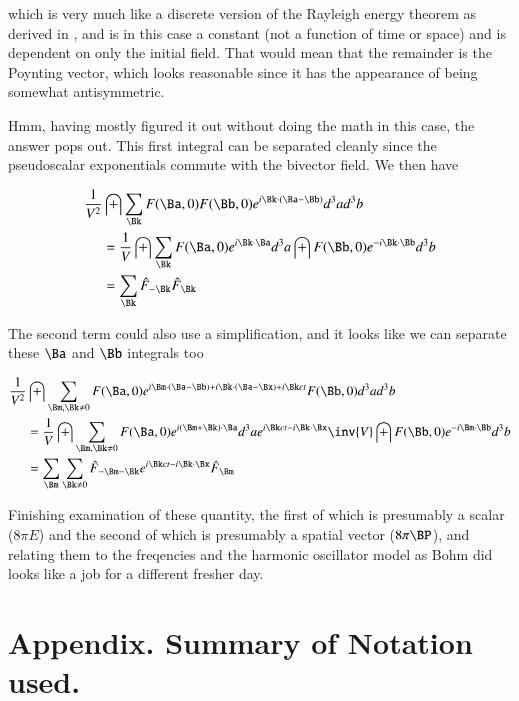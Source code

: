 \documentclass{article}
\begin{document}
which is very much like a discrete version of the Rayleigh energy theorem as derived in \cite{PJqmFourier}, and is in this case
a constant (not a function of time or space) and is dependent on only the initial field.
That would mean that the remainder is the Poynting vector,
which looks reasonable since it has the appearance of being somewhat antisymmetric.

Hmm, having mostly figured it out without doing the math in this case, the answer pops out.  This first integral can be separated cleanly since the pseudoscalar
exponentials commute with the bivector field.  We then have

\begin{align*}
\frac{1}{V^2} &\int \sum_{\Bk} F(\Ba, 0) F(\Bb, 0) e^{ i \Bk \cdot (\Ba - \Bb) } d^3 a d^3 b \\
&= \frac{1}{V} \int \sum_{\Bk} F(\Ba, 0) e^{ i \Bk \cdot \Ba } d^3 a \int F(\Bb, 0) e^{ -i \Bk \cdot \Bb } d^3 b \\
&= \sum_{\Bk} \hat{F}_{-\Bk} \hat{F}_{\Bk} \\
\end{align*}


The second term could also use a simplification, and it looks like we can separate these $\Ba$ and $\Bb$ integrals too

\begin{align*}
\frac{1}{V^2} &\int \sum_{\Bm, \Bk \ne 0} F(\Ba, 0) e^{ 
i \Bm \cdot (\Ba -\Bb) 
+i \Bk \cdot (\Ba -\Bx)
+ i \Bk ct 
} F(\Bb, 0) d^3 a d^3 b \\
&=\frac{1}{V} \int \sum_{\Bm, \Bk \ne 0} F(\Ba, 0) e^{ i (\Bm + \Bk) \cdot \Ba } d^3 a
e^{ i \Bk ct -i \Bk \cdot \Bx }
\inv{V} \int F(\Bb, 0) 
e^{-i \Bm \cdot \Bb}
d^3 b
 \\
&= \sum_{\Bm} \sum_{\Bk \ne 0} \hat{F}_{-\Bm -\Bk} e^{ i \Bk ct -i \Bk \cdot \Bx } \hat{F}_{\Bm} \\
\end{align*}

Finishing examination of these quantity, the first of which is presumably a scalar ($8\pi E$) and the second of which is presumably a spatial vector ($8\pi \BP$), and relating them to the freqencies and the harmonic oscillator model as Bohm did looks like a job
for a different fresher day.

\section{ Appendix.  Summary of Notation used. }
\end{document}

